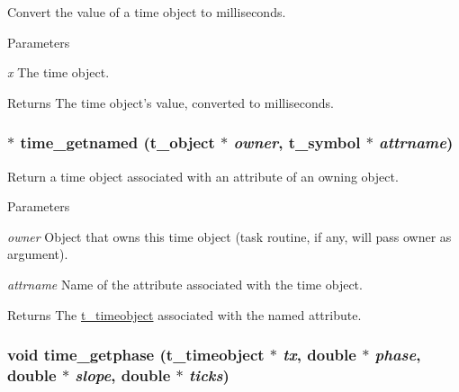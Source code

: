 Convert the value of a time object to milliseconds. 
\begin{DoxyParams}{Parameters}
\item[{\em x}]The time object. \end{DoxyParams}
\begin{DoxyReturn}{Returns}
The time object's value, converted to milliseconds. 
\end{DoxyReturn}
\hypertarget{group__time_ga2805d69712a55bf77d5083da40108cec}{
\subsubsection[{time\_\-getnamed}]{$\ast$ time\_\-getnamed ({\bf t\_\-object} $\ast$ {\em owner}, \/  {\bf t\_\-symbol} $\ast$ {\em attrname})}}
\label{group__time_ga2805d69712a55bf77d5083da40108cec}


Return a time object associated with an attribute of an owning object. 
\begin{DoxyParams}{Parameters}
\item[{\em owner}]Object that owns this time object (task routine, if any, will pass owner as argument). \item[{\em attrname}]Name of the attribute associated with the time object. \end{DoxyParams}
\begin{DoxyReturn}{Returns}
The \hyperlink{group__time_gab568d2ffd4d84ca17c0b90cf2f7c6a40}{t\_\-timeobject} associated with the named attribute. 
\end{DoxyReturn}
\hypertarget{group__time_ga2a96b168022b712f38245517a9e20a14}{
\subsubsection[{time\_\-getphase}]{\setlength{\rightskip}{0pt plus 5cm}void time\_\-getphase ({\bf t\_\-timeobject} $\ast$ {\em tx}, \/  double $\ast$ {\em phase}, \/  double $\ast$ {\em slope}, \/  double $\ast$ {\em ticks})}}
\label{group__time_ga2a96b168022b712f38245517a9e20a14}


